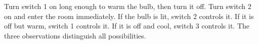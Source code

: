 Turn switch 1 on long enough to warm the bulb, then turn it off. Turn switch 2 on and enter the room immediately. If the bulb is lit, switch 2 controls it. If it is off but warm, switch 1 controls it. If it is off and cool, switch 3 controls it. The three observations distinguish all possibilities.
